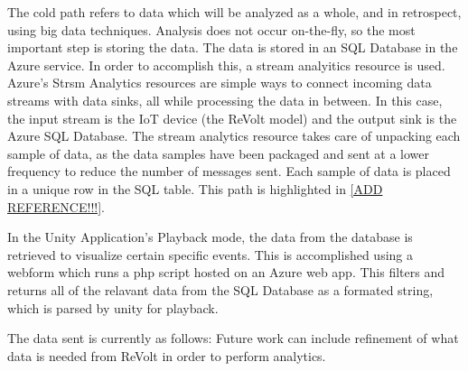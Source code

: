 The cold path refers to data which will be analyzed as a whole, and in retrospect, using big data techniques. Analysis does not occur on-the-fly, so the most important step is storing the data. The data is stored in an SQL Database in the Azure service. In order to accomplish this, a stream analyitics resource is used. Azure's Strsm Analytics resources are simple ways to connect incoming data streams with data sinks, all while processing the data in between. In this case, the input stream is the IoT device (the ReVolt model) and the output sink is the Azure SQL Database. The stream analytics resource takes care of unpacking each sample of data, as the data samples have been packaged and sent at a lower frequency to reduce the number of messages sent. Each sample of data is placed in a unique row in the SQL table. This path is highlighted in \cref{ADD REFERENCE!!!}. 

In the Unity Application's Playback mode, the data from the database is retrieved to visualize certain specific events. This is accomplished using a webform which runs a php script hosted on an Azure web app. This filters and returns all of the relavant data from the SQL Database as a formated string, which is parsed by unity for playback.

The data sent is currently as follows:
Future work can include refinement of what data is needed from ReVolt in order to perform analytics.






